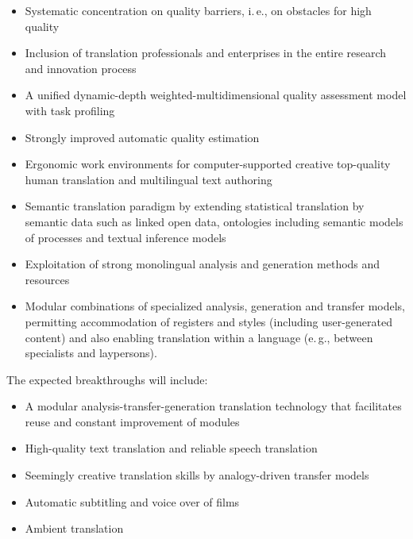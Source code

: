 \documentclass[10pt, plain]{../../metanetpaper}
\begin{document}
\begin{multicols}{2}
\begin{itemize}
\item Systematic concentration on quality barriers, i.\,e., on obstacles for high quality
\item Inclusion of translation professionals and enterprises in the entire research and innovation process
\item A unified dynamic-depth weighted-multidimensional quality assessment model with task profiling
\item Strongly improved automatic quality estimation
\item Ergonomic work environments for computer-supported creative top-quality human translation and multilingual text authoring
\item Semantic translation paradigm by extending statistical translation by semantic data such as linked open data, ontologies including semantic models of processes and textual inference models
\item Exploitation of strong monolingual analysis and generation methods and resources
\item Modular combinations of specialized analysis, generation and transfer models, permitting accommodation of registers and styles (including user-generated content) and also enabling translation within a language (e.\,g., between specialists and laypersons).
\end{itemize}

The expected breakthroughs will include:

\begin{itemize}
\item A modular analysis-transfer-generation translation technology that facilitates reuse and constant improvement of modules
\item High-quality text translation and reliable speech translation
\item Seemingly creative translation skills by analogy-driven transfer models
\item Automatic subtitling and voice over of films
\item Ambient translation
\end{itemize}


\end{multicols}
\end{document}
